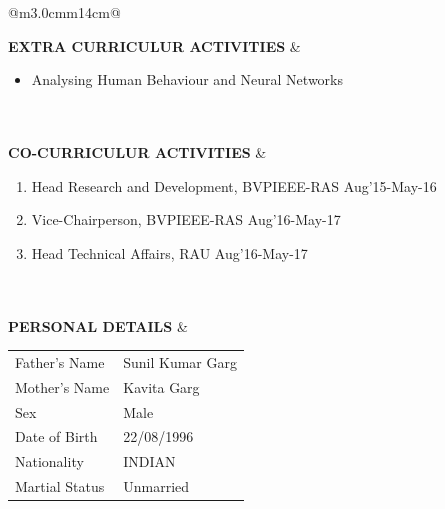 \documentclass[a4paper]{article}
\begin{document}
\begin{longtable}{@{}m{3.0cm}m{14cm}@{}}
			
			\textrm{\textbf {EXTRA \newline CURRICULUR ACTIVITIES}} & 
				\begin{itemize}
					\itemsep -2pt
					\item
					Analysing Human Behaviour and Neural Networks
				\end{itemize}
			\\ \\
			
			
			\textrm{\textbf {CO-CURRICULUR ACTIVITIES}} & 
				\begin{enumerate}
					\itemsep -2pt
					\item
					Head Research and Development, BVPIEEE-RAS \hfill Aug'15-May-16
					\item
					Vice-Chairperson, BVPIEEE-RAS \hfill Aug'16-May-17
					\item
					Head Technical Affairs, RAU \hfill Aug'16-May-17
				\end{enumerate}
			\\ \\
			
			\textrm{\textbf {PERSONAL DETAILS}} & 
				\begin{center}
					\begin{tabular}{ m{4cm}m{4cm}}
						Father's Name & Sunil Kumar Garg \\
						Mother's Name & Kavita Garg \\
						Sex & Male \\
						Date of Birth & 22/08/1996 \\
						Nationality & INDIAN \\
						Martial Status & Unmarried \\
  					\end{tabular}
				\end{center}
			\\ \\
			

\end{longtable}
\end{document}
